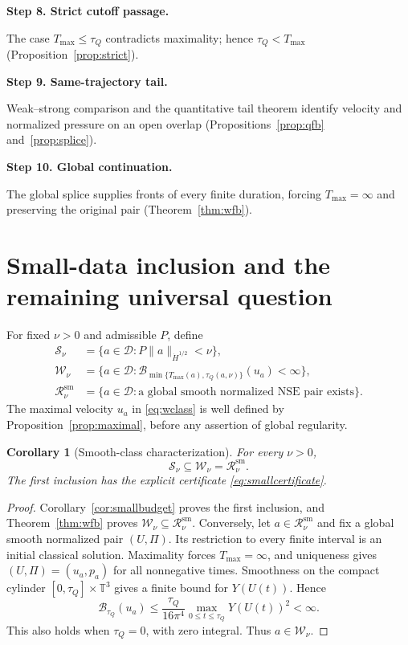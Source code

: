 \documentclass[11pt,a4paper]{article}
\numberwithin{equation}{section}
\theoremstyle{plain}
\newtheorem{corollary}[theorem]{Corollary}
\theoremstyle{definition}
\theoremstyle{remark}
\newcommand{\T}{\mathbb T^3}
\newcommand{\D}{\mathcal D}
\newcommand{\HH}[1]{\dot H^{#1}}
\newcommand{\norm}[2]{\lVert #1\rVert_{#2}}
\newcommand{\Tmax}{T_{\max}}
\newcommand{\tq}{\tau_Q}
\newcommand{\Budget}{\mathcal B}
\newcommand{\step}[2]{\par\medskip\noindent\textbf{Step #1. #2}\par\smallskip}
\begin{document}
\step{8}{Strict cutoff passage.}
The case $\Tmax\le\tq$ contradicts maximality; hence
$\tq<\Tmax$ (Proposition~\ref{prop:strict}).

\step{9}{Same-trajectory tail.}
Weak--strong comparison and the quantitative tail theorem identify
velocity and normalized pressure on an open overlap
(Propositions~\ref{prop:qfb} and~\ref{prop:splice}).

\step{10}{Global continuation.}
The global splice supplies fronts of every finite duration, forcing
$\Tmax=\infty$ and preserving the original pair (Theorem~\ref{thm:wfb}).

\section{Small-data inclusion and the remaining universal question}\label{sec:classes}
For fixed $\nu>0$ and admissible $P$, define
\begin{align}
 \mathcal S_\nu
 &=\{a\in\D:P\norm{a}{\HH{1/2}}<\nu\},\label{eq:smallclass}\\
 \mathcal W_\nu
 &=\{a\in\D:\Budget_{\min\{\Tmax(a),\tq(a,\nu)\}}(u_a)<\infty\},
 \label{eq:wclass}\\
 \mathcal R_\nu^{\mathrm{sm}}
 &=\{a\in\D:\text{a global smooth normalized NSE pair exists}\}.
 \label{eq:rclass}
\end{align}
The maximal velocity $u_a$ in \eqref{eq:wclass} is well defined by
Proposition~\ref{prop:maximal}, before any assertion of global regularity.

\begin{corollary}[Smooth-class characterization]\label{cor:inclusion}
For every $\nu>0$,
\begin{equation}\label{eq:inclusions}
 \mathcal S_\nu\subseteq\mathcal W_\nu
 =\mathcal R_\nu^{\mathrm{sm}}.
\end{equation}
The first inclusion has the explicit certificate
\eqref{eq:smallcertificate}.
\end{corollary}
\begin{proof}
Corollary~\ref{cor:smallbudget} proves the first inclusion, and
Theorem~\ref{thm:wfb} proves
$\mathcal W_\nu\subseteq\mathcal R_\nu^{\mathrm{sm}}$.
Conversely, let $a\in\mathcal R_\nu^{\mathrm{sm}}$ and fix a global
smooth normalized pair $(U,\Pi)$. Its restriction to every finite
interval is an initial classical solution. Maximality forces
$\Tmax=\infty$, and uniqueness gives $(U,\Pi)=(u_a,p_a)$ for all
nonnegative times. Smoothness on the compact cylinder
$[0,\tq]\times\T$ gives a finite bound for $Y(U(t))$. Hence
\begin{equation}\label{eq:conversebound}
 \Budget_{\tq}(u_a)
 \le\frac{\tq}{16\pi^4}
       \max_{0\le t\le\tq}Y(U(t))^2<\infty.
\end{equation}
This also holds when $\tq=0$, with zero integral. Thus
$a\in\mathcal W_\nu$.
\end{proof}
\end{document}
